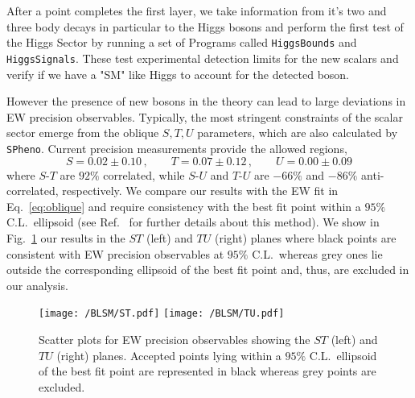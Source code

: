 After a point completes the first layer, we take information from it's two and three body decays in particular to the Higgs bosons and perform the first test of the Higgs Sector by running a set of Programs called \texttt{HiggsBounds} and \texttt{HiggsSignals}. These test experimental detection limits for the new scalars and verify if we have a "SM" like Higgs to account for the detected boson. 

However the presence of new bosons in the theory can lead to large deviations in EW precision observables. Typically, the most stringent constraints of the scalar sector emerge from the oblique $S,T,U$ parameters, which are also calculated by \texttt{SPheno}. Current precision measurements provide the allowed regions,
\begin{equation}
	S = 0.02 \pm 0.10\,, \qquad T = 0.07 \pm 0.12\,, \qquad U = 0.00 \pm 0.09
	\label{eq:oblique}
\end{equation}
%
where $S$-$T$ are $92\%$ correlated, while $S$-$U$ and $T$-$U$ are $-66\%$ and $-86\%$ anti-correlated, respectively. We compare our results with the EW fit in Eq.~\eqref{eq:oblique} and require consistency with the best fit point within a $95\%$ C.L.~ellipsoid (see Ref.~\cite{Costa:2014qga} for further details about this method). We show in Fig.~\ref{fig:STU} our results in the $ST$ (left) and $TU$ (right) planes where black points are consistent with EW precision observables at $95\%$ C.L.~whereas grey ones lie outside the corresponding ellipsoid of the best fit point and, thus, are excluded in our analysis. 
\begin{figure}[h]
	\centering
	\texttt{[image: /BLSM/ST.pdf]}
	\texttt{[image: /BLSM/TU.pdf]}
	\caption{Scatter plots for EW precision observables showing the $ST$ (left) and $TU$ (right) planes. Accepted points lying within a $95\%$ C.L.~ellipsoid of the best fit point are represented in black whereas grey points are excluded.}
	\label{fig:STU}
\end{figure}	



